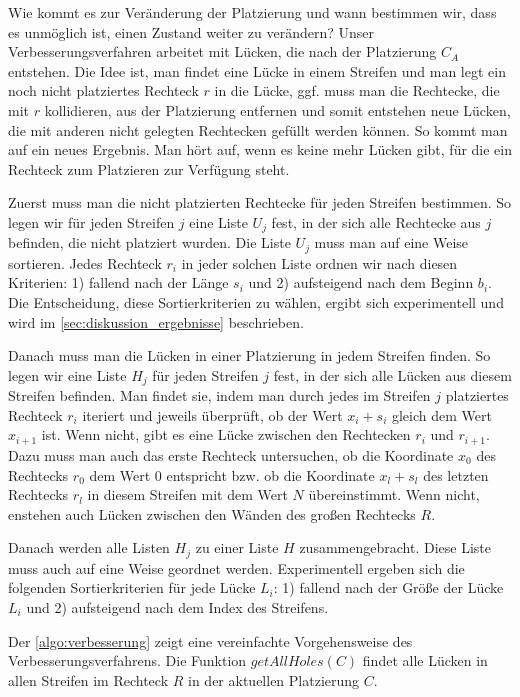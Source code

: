Wie kommt es zur Veränderung der Platzierung und wann bestimmen wir,
dass es unmöglich ist, einen Zustand weiter zu verändern?
Unser Verbesserungsverfahren arbeitet mit Lücken, die 
nach der Platzierung $C_A$ entstehen.
Die Idee ist, man findet eine Lücke in einem Streifen 
und man legt ein noch nicht platziertes Rechteck $r$ in die Lücke,
ggf. muss man die Rechtecke,
die mit $r$ kollidieren, aus der Platzierung entfernen
und somit entstehen neue Lücken,
die mit anderen nicht gelegten Rechtecken gefüllt werden können.
So kommt man auf ein neues Ergebnis.
Man hört auf, wenn es keine mehr Lücken gibt, für die ein Rechteck zum Platzieren zur Verfügung steht.


Zuerst muss man die nicht platzierten Rechtecke für jeden Streifen bestimmen. 
So legen wir für jeden Streifen $j$ eine Liste $U_j$ fest, in der sich alle 
Rechtecke aus $j$ befinden, die nicht platziert wurden.
Die Liste $U_j$ muss man auf eine Weise sortieren.
Jedes Rechteck $r_i$ in jeder solchen Liste ordnen wir nach diesen Kriterien:
1) fallend nach der Länge $s_i$ und 2) aufsteigend nach dem Beginn $b_i$.
Die Entscheidung, diese Sortierkriterien zu wählen, ergibt sich experimentell 
und wird im \cref{sec:diskussion_ergebnisse} beschrieben.


Danach muss man die Lücken in einer Platzierung in jedem Streifen finden.
So legen wir eine Liste $H_j$ für jeden Streifen $j$ fest, in der sich alle
Lücken aus diesem Streifen befinden. Man findet sie, indem
man durch jedes im Streifen $j$ platziertes Rechteck $r_i$ iteriert und jeweils überprüft,
ob der Wert $x_i + s_i$ gleich dem Wert $x_{i+1}$ ist. Wenn nicht, gibt es eine Lücke
zwischen den Rechtecken $r_i$ und $r_{i+1}$.
Dazu muss man auch das erste Rechteck untersuchen, ob die Koordinate $x_0$ des Rechtecks $r_0$
dem Wert 0 entspricht bzw. ob die Koordinate $x_l + s_l$ des letzten Rechtecks $r_l$ in diesem Streifen
mit dem Wert $N$ übereinstimmt.
Wenn nicht, enstehen auch Lücken zwischen den Wänden des großen Rechtecks $R$.  

Danach werden alle Listen $H_j$ zu einer Liste $H$ zusammengebracht.
Diese Liste muss auch auf eine Weise geordnet werden. 
Experimentell ergeben sich die folgenden Sortierkriterien für jede Lücke $L_i$: 
1) fallend nach der Größe der Lücke $L_i$ und 2) aufsteigend nach dem
Index des Streifens.






Der \cref{algo:verbesserung} zeigt eine vereinfachte Vorgehensweise des Verbesserungsverfahrens.
Die Funktion $getAllHoles(C)$ findet alle Lücken in allen Streifen im Rechteck $R$ in der
aktuellen Platzierung $C$. 





